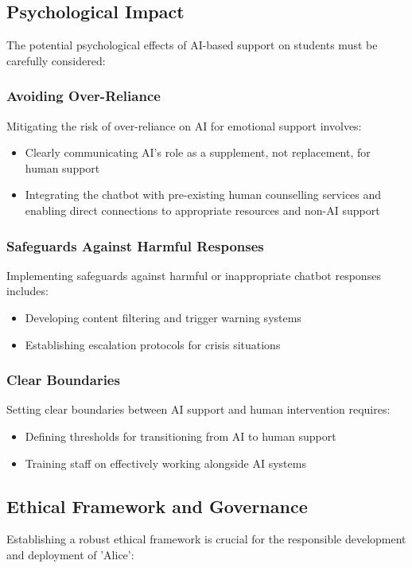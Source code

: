 \documentclass[15pt,a4paper]{article}
\begin{document}
\begin{multicols}{2}
\subsection{Psychological Impact}
The potential psychological effects of AI-based support on students must be carefully considered:

\subsubsection*{Avoiding Over-Reliance}
Mitigating the risk of over-reliance on AI for emotional support \textit{\parencite[p. 746]{Miner2022}} involves:
\begin{itemize}
    \item Clearly communicating AI's role as a supplement, not replacement, for human support
    \item Integrating the chatbot with pre-existing human counselling services and enabling direct connections to appropriate resources and non-AI support
\end{itemize}

\subsubsection*{Safeguards Against Harmful Responses}
Implementing safeguards against harmful or inappropriate chatbot responses \textit{\parencite[p. e11510]{Bickmore2021}} includes:
\begin{itemize}
    \item Developing content filtering and trigger warning systems
    \item Establishing escalation protocols for crisis situations
\end{itemize}

\subsubsection*{Clear Boundaries}
Setting clear boundaries between AI support and human intervention \textit{\parencite{APA2024}} requires:
\begin{itemize}
    \item Defining thresholds for transitioning from AI to human support
    \item Training staff on effectively working alongside AI systems
\end{itemize}

\subsection{Ethical Framework and Governance}
Establishing a robust ethical framework is crucial for the responsible development and deployment of 'Alice':


\end{multicols}
\end{document}
